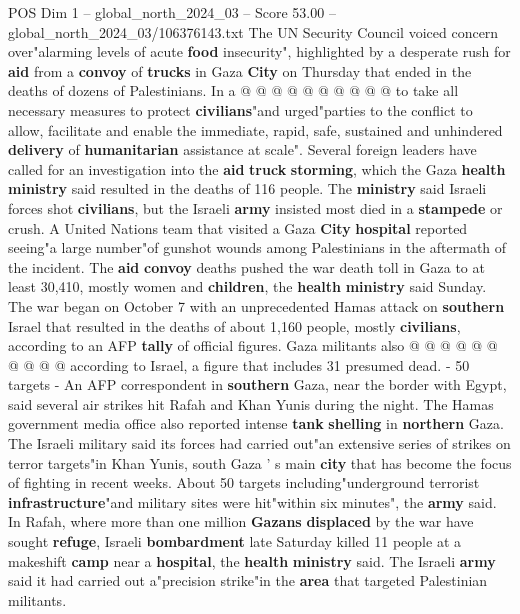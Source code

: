 \begin{textsample}{POS Dim 1 – global\_north\_2024\_03 – Score 53.00 – global\_north\_2024\_03/106376143.txt}
The UN Security Council voiced concern over"alarming levels of acute \textbf{food} insecurity", highlighted by a desperate rush for \textbf{aid} from a \textbf{convoy} of \textbf{trucks} in Gaza \textbf{City} on Thursday that ended in the deaths of dozens of Palestinians.
In a @ @ @ @ @ @ @ @ @ @ to take all necessary measures to protect \textbf{civilians}"and urged"parties to the conflict to allow, facilitate and enable the immediate, rapid, safe, sustained and unhindered \textbf{delivery} of \textbf{humanitarian} assistance at scale".
Several foreign leaders have called for an investigation into the \textbf{aid} \textbf{truck} \textbf{storming}, which the Gaza \textbf{health} \textbf{ministry} said resulted in the deaths of 116 people.
The \textbf{ministry} said Israeli forces shot \textbf{civilians}, but the Israeli \textbf{army} insisted most died in a \textbf{stampede} or crush.
A United Nations team that visited a Gaza \textbf{City} \textbf{hospital} reported seeing"a large number"of gunshot wounds among Palestinians in the aftermath of the incident.
The \textbf{aid} \textbf{convoy} deaths pushed the war death toll in Gaza to at least 30,410, mostly women and \textbf{children}, the \textbf{health} \textbf{ministry} said Sunday.
The war began on October 7 with an unprecedented Hamas attack on \textbf{southern} Israel that resulted in the deaths of about 1,160 people, mostly \textbf{civilians}, according to an AFP \textbf{tally} of official figures.
Gaza militants also @ @ @ @ @ @ @ @ @ @ according to Israel, a figure that includes 31 presumed dead. - 50 targets - An AFP correspondent in \textbf{southern} Gaza, near the border with Egypt, said several air strikes hit Rafah and Khan Yunis during the night.
The Hamas government media office also reported intense \textbf{tank} \textbf{shelling} in \textbf{northern} Gaza.
The Israeli military said its forces had carried out"an extensive series of strikes on terror targets"in Khan Yunis, south Gaza ' s main \textbf{city} that has become the focus of fighting in recent weeks.
About 50 targets including"underground terrorist \textbf{infrastructure}"and military sites were hit"within six minutes", the \textbf{army} said.
In Rafah, where more than one million \textbf{Gazans} \textbf{displaced} by the war have sought \textbf{refuge}, Israeli \textbf{bombardment} late Saturday killed 11 people at a makeshift \textbf{camp} near a \textbf{hospital}, the \textbf{health} \textbf{ministry} said.
The Israeli \textbf{army} said it had carried out a"precision strike"in the \textbf{area} that targeted Palestinian militants.

\end{textsample}
